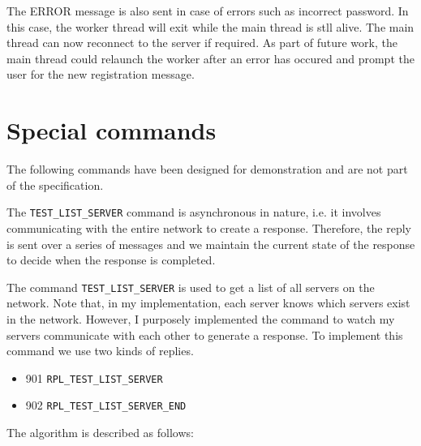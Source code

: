 \documentclass[letterpaper,twocolumn,10pt]{article}
\begin{document}
The ERROR message is also sent in case of errors such as incorrect password. In this case,
the worker thread will exit while the main thread is stll alive. The main thread can now reconnect
to the server if required. As part of future work, the main thread could relaunch the worker after an error
has occured and prompt the user for the new registration message.

\section{Special commands}

The following commands have been designed for demonstration and are not part of
the specification.

The \verb|TEST_LIST_SERVER| command is asynchronous in nature, i.e. it involves communicating with the
entire network to create a response. Therefore, the reply is sent over a series of messages and we
maintain the current state of the response to decide when the response is completed.

The command \verb|TEST_LIST_SERVER| is used to get a list of all servers on the
network. Note that, in my implementation, each server knows which servers exist
in the network. However, I purposely implemented the command to watch my servers
communicate with each other to generate a response. To implement this command we use two kinds of
replies.

\begin{itemize}
	\item 901 \verb|RPL_TEST_LIST_SERVER|
	\item 902 \verb|RPL_TEST_LIST_SERVER_END|
\end{itemize}

The algorithm is described as follows:
\end{document}
